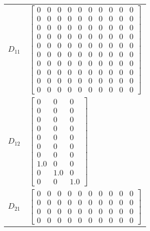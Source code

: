 \begin{tabular}{cl}
 $D_{11}$ & $\left[\begin{matrix}0 & 0 & 0 & 0 & 0 & 0 & 0 & 0 & 0 & 0\\0 & 0 & 0 & 0 & 0 & 0 & 0 & 0 & 0 & 0\\0 & 0 & 0 & 0 & 0 & 0 & 0 & 0 & 0 & 0\\0 & 0 & 0 & 0 & 0 & 0 & 0 & 0 & 0 & 0\\0 & 0 & 0 & 0 & 0 & 0 & 0 & 0 & 0 & 0\\0 & 0 & 0 & 0 & 0 & 0 & 0 & 0 & 0 & 0\\0 & 0 & 0 & 0 & 0 & 0 & 0 & 0 & 0 & 0\\0 & 0 & 0 & 0 & 0 & 0 & 0 & 0 & 0 & 0\\0 & 0 & 0 & 0 & 0 & 0 & 0 & 0 & 0 & 0\\0 & 0 & 0 & 0 & 0 & 0 & 0 & 0 & 0 & 0\end{matrix}\right]$                                                                                                                                                                                                                                       \\
 $D_{12}$ & $\left[\begin{matrix}0 & 0 & 0\\0 & 0 & 0\\0 & 0 & 0\\0 & 0 & 0\\0 & 0 & 0\\0 & 0 & 0\\0 & 0 & 0\\1.0 & 0 & 0\\0 & 1.0 & 0\\0 & 0 & 1.0\end{matrix}\right]$                                                                                                                                                                                                                                                                                                                                                                                                                                                                                                                         \\
 $D_{21}$ & $\left[\begin{matrix}0 & 0 & 0 & 0 & 0 & 0 & 0 & 0 & 0 & 0\\0 & 0 & 0 & 0 & 0 & 0 & 0 & 0 & 0 & 0\\0 & 0 & 0 & 0 & 0 & 0 & 0 & 0 & 0 & 0\\0 & 0 & 0 & 0 & 0 & 0 & 0 & 0 & 0 & 0\end{matrix}\right]$                                                                                                                                                                                                                                                                                                                                                                                                                                                                                 \\
\hline
\end{tabular}